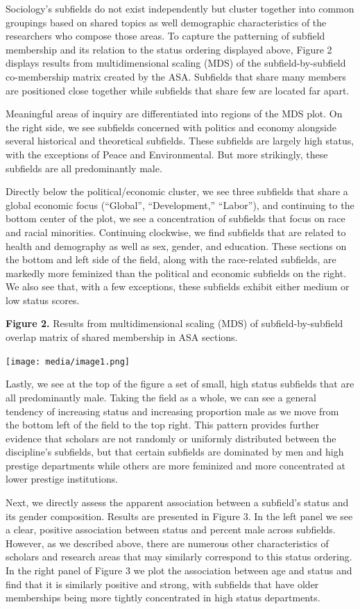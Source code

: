 \documentclass{article}
\begin{document}
Sociology's subfields do not exist independently but cluster together
into common groupings based on shared topics as well demographic
characteristics of the researchers who compose those areas. To capture
the patterning of subfield membership and its relation to the status
ordering displayed above, Figure 2 displays results from
multidimensional scaling (MDS) of the subfield-by-subfield co-membership
matrix created by the ASA. Subfields that share many members are
positioned close together while subfields that share few are located far
apart.

Meaningful areas of inquiry are differentiated into regions of the MDS
plot. On the right side, we see subfields concerned with politics and
economy alongside several historical and theoretical subfields. These
subfields are largely high status, with the exceptions of Peace and
Environmental. But more strikingly, these subfields are all
predominantly male.

Directly below the political/economic cluster, we see three subfields
that share a global economic focus (``Global'', ``Development,''
``Labor''), and continuing to the bottom center of the plot, we see a
concentration of subfields that focus on race and racial minorities.
Continuing clockwise, we find subfields that are related to health and
demography as well as sex, gender, and education. These sections on the
bottom and left side of the field, along with the race-related
subfields, are markedly more feminized than the political and economic
subfields on the right. We also see that, with a few exceptions, these
subfields exhibit either medium or low status scores.

\textbf{Figure 2.} Results from multidimensional scaling (MDS) of
subfield-by-subfield overlap matrix of shared membership in ASA
sections.

\texttt{[image: media/image1.png]}

Lastly, we see at the top of the figure a set of small, high status
subfields that are all predominantly male. Taking the field as a whole,
we can see a general tendency of increasing status and increasing
proportion male as we move from the bottom left of the field to the top
right. This pattern provides further evidence that scholars are not
randomly or uniformly distributed between the discipline's subfields,
but that certain subfields are dominated by men and high prestige
departments while others are more feminized and more concentrated at
lower prestige institutions.

Next, we directly assess the apparent association between a subfield's
status and its gender composition. Results are presented in Figure 3. In
the left panel we see a clear, positive association between status and
percent male across subfields. However, as we described above, there are
numerous other characteristics of scholars and research areas that may
similarly correspond to this status ordering. In the right panel of
Figure 3 we plot the association between age and status and find that it
is similarly positive and strong, with subfields that have older
memberships being more tightly concentrated in high status departments.
\end{document}
